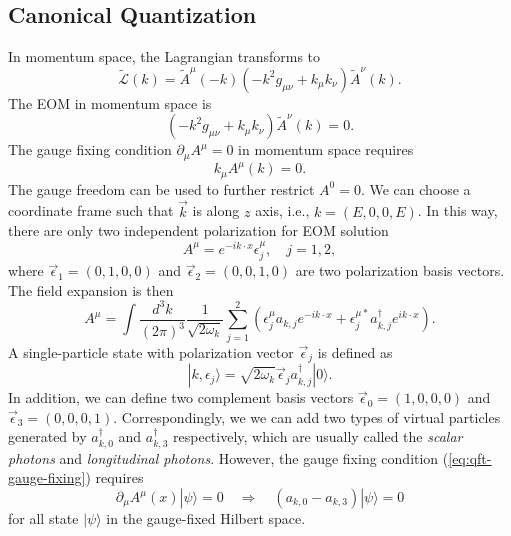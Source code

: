 \subsection{Canonical Quantization}
In momentum space, the Lagrangian transforms to
\begin{equation}
	\tilde{\mathcal L}(k) = \tilde{A}^\mu(-k)\left(-k^2 g_{\mu\nu}+k_\mu k_\nu\right) \tilde{A}^\nu(k).
\end{equation}
The EOM in momentum space is
\begin{equation}
	(-k^2 g_{\mu\nu}+k_\mu k_\nu) \tilde{A}^\nu(k) = 0.
\end{equation}
The gauge fixing condition $\partial_\mu A^\mu = 0$ in momentum space requires
\begin{equation}\label{eq:qft-gauge-fixing}
	k_\mu A^\mu(k) = 0.
\end{equation}
The gauge freedom can be used to further restrict $A^0 = 0$.
We can choose a coordinate frame such that $\vec k$ is along $z$ axis, i.e., $k = (E,0,0,E)$.
In this way, there are only two independent polarization for EOM solution
\begin{equation}
	A^\mu = e^{-ik\cdot x} \epsilon^\mu_j, \quad j=1,2,
\end{equation}
where $\vec\epsilon_1 = (0,1,0,0)$ and $\vec\epsilon_2 = (0,0,1,0)$ are two polarization basis vectors.
The field expansion is then
\begin{equation}
	A^\mu = \int \frac{d^{3} k}{(2\pi)^{3}}\frac{1}{\sqrt{2\omega_k}}
	\sum_{j=1}^2 \left(\epsilon^\mu_j a_{k,j} e^{-ik\cdot x} + 
	\epsilon^{\mu*}_j a^\dagger_{k,j} e^{ik\cdot x}\right).
\end{equation}
A single-particle state with polarization vector $\vec\epsilon_j$ is defined as
\begin{equation}
	|k,\epsilon_j\rangle = \sqrt{2\omega_k}	\vec\epsilon_j a^\dagger_{k,j}|0\rangle.
\end{equation}
In addition, we can define two complement basis vectors $\vec\epsilon_0 = (1,0,0,0)$ and $\vec\epsilon_3 = (0,0,0,1)$.
Correspondingly, we we can add two types of virtual particles generated by $a^\dagger_{k,0}$ and $a^\dagger_{k,3}$ respectively, which are usually called the \textit{scalar photons} and \textit{longitudinal photons}.
However, the gauge fixing condition (\ref{eq:qft-gauge-fixing}) requires
\begin{equation}
	\partial_\mu A^\mu(x)|\psi\rangle = 0 \quad \Longrightarrow \quad
	(a_{k,0}-a_{k,3})|\psi\rangle = 0
\end{equation}
for all state $|\psi\rangle$ in the gauge-fixed Hilbert space.

